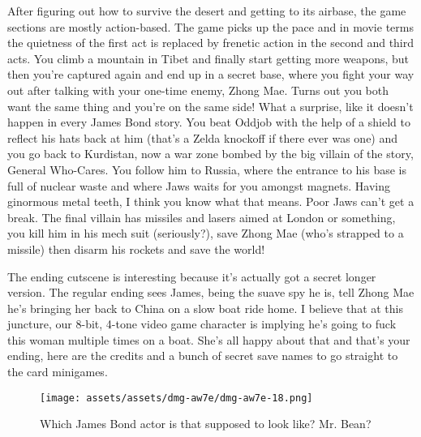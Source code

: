 \documentclass{book}
\let\oldcenter\center
\let\oldendcenter\endcenter
\renewenvironment{center}{\setlength\topsep{0pt}\oldcenter}{\oldendcenter}
\begin{document}
\begin{center}
\quad\vspace{4pt}
\quad\vspace{4pt}
\end{center}
After figuring out how to survive the desert and getting to its airbase, the game sections are mostly action-based. The game picks up the pace and in movie terms the quietness of the first act is replaced by frenetic action in the second and third acts. You climb a mountain in Tibet and finally start getting more weapons, but then you’re captured again and end up in a secret base, where you fight your way out after talking with your one-time enemy, Zhong Mae. Turns out you both want the same thing and you’re on the same side! What a surprise, like it doesn’t happen in every James Bond story. You beat Oddjob with the help of a shield to reflect his hats back at him (that’s a Zelda knockoff if there ever was one) and you go back to Kurdistan, now a war zone bombed by the big villain of the story, General Who-Cares. You follow him to Russia, where the entrance to his base is full of nuclear waste and where Jaws waits for you amongst magnets. Having ginormous metal teeth, I think you know what that means. Poor Jaws can’t get a break. The final villain has missiles and lasers aimed at London or something, you kill him in his mech suit (seriously?), save Zhong Mae (who’s strapped to a missile) then disarm his rockets and save the world!

The ending cutscene is interesting because it’s actually got a secret longer version. The regular ending sees James, being the suave spy he is, tell Zhong Mae he’s bringing her back to China on a slow boat ride home. I believe that at this juncture, our 8-bit, 4-tone video game character is implying he’s going to fuck this woman multiple times on a boat. She’s all happy about that and that’s your ending, here are the credits and a bunch of secret save names to go straight to the card minigames.

\begin{figure}[hbt]
\vskip 10pt
\centering \texttt{[image: assets/assets/dmg-aw7e/dmg-aw7e-18.png]}\par\pagetwodescription Which James Bond actor is that supposed to look like? Mr. Bean?
\vskip 6pt
\end{figure}
\end{document}
